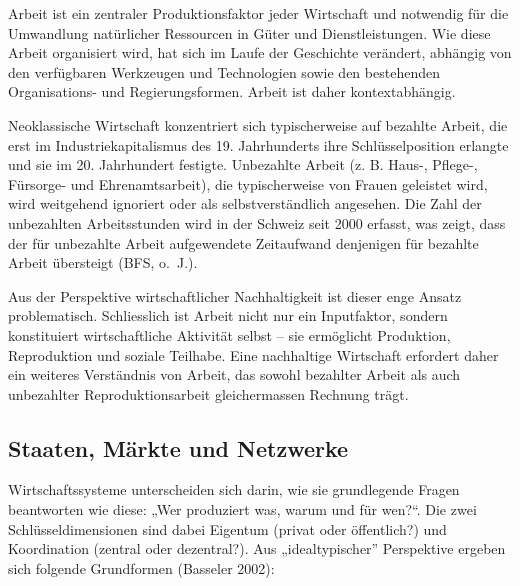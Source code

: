 \documentclass[
  nswissgerman,
  a4paper,
  DIV=11,
  numbers=noendperiod,
  oneside,
  openany]{scrreprt}
\begin{document}
\begin{tcolorbox}[enhanced jigsaw, arc=.35mm, bottomrule=.15mm, bottomtitle=1mm, breakable, colback=white, colbacktitle=quarto-callout-note-color!10!white, colframe=quarto-callout-note-color-frame, coltitle=black, left=2mm, leftrule=.75mm, opacityback=0, opacitybacktitle=0.6, rightrule=.15mm, title={Arbeit ist mehr als bezahlte Arbeit}, titlerule=0mm, toprule=.15mm, toptitle=1mm]

Arbeit ist ein zentraler Produktionsfaktor jeder Wirtschaft und
notwendig für die Umwandlung natürlicher Ressourcen in Güter und
Dienstleistungen. Wie diese Arbeit organisiert wird, hat sich im Laufe
der Geschichte verändert, abhängig von den verfügbaren Werkzeugen und
Technologien sowie den bestehenden Organisations- und Regierungsformen.
Arbeit ist daher kontextabhängig.

Neoklassische Wirtschaft konzentriert sich typischerweise auf bezahlte
Arbeit, die erst im Industriekapitalismus des 19. Jahrhunderts ihre
Schlüsselposition erlangte und sie im 20. Jahrhundert festigte.
Unbezahlte Arbeit (z. B. Haus-, Pflege-, Fürsorge- und Ehrenamtsarbeit),
die typischerweise von Frauen geleistet wird, wird weitgehend ignoriert
oder als selbstverständlich angesehen. Die Zahl der unbezahlten
Arbeitsstunden wird in der Schweiz seit 2000 erfasst, was zeigt, dass
der für unbezahlte Arbeit aufgewendete Zeitaufwand denjenigen für
bezahlte Arbeit übersteigt (BFS, o.~J.).

Aus der Perspektive wirtschaftlicher Nachhaltigkeit ist dieser enge
Ansatz problematisch. Schliesslich ist Arbeit nicht nur ein Inputfaktor,
sondern konstituiert wirtschaftliche Aktivität selbst -- sie ermöglicht
Produktion, Reproduktion und soziale Teilhabe. Eine nachhaltige
Wirtschaft erfordert daher ein weiteres Verständnis von Arbeit, das
sowohl bezahlter Arbeit als auch unbezahlter Reproduktionsarbeit
gleichermassen Rechnung trägt.

\end{tcolorbox}

\subsection{Staaten, Märkte und
Netzwerke}\label{staaten-muxe4rkte-und-netzwerke}

Wirtschaftssysteme unterscheiden sich darin, wie sie grundlegende Fragen
beantworten wie diese: „Wer produziert was, warum und für wen?``. Die
zwei Schlüsseldimensionen sind dabei Eigentum (privat oder öffentlich?)
und Koordination (zentral oder dezentral?). Aus „idealtypischer''
Perspektive ergeben sich folgende Grundformen (Basseler 2002):
\end{document}
